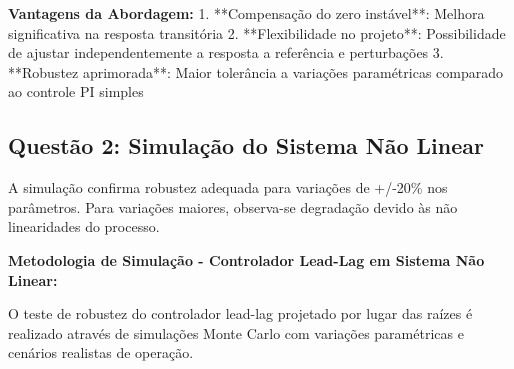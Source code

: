 \documentclass[a4paper,12pt]{article}
\begin{document}
\textbf{Vantagens da Abordagem:}
1. **Compensação do zero instável**: Melhora significativa na resposta transitória
2. **Flexibilidade no projeto**: Possibilidade de ajustar independentemente a resposta a referência e perturbações
3. **Robustez aprimorada**: Maior tolerância a variações paramétricas comparado ao controle PI simples

\subsection{Questão 2: Simulação do Sistema Não Linear}

A simulação confirma robustez adequada para variações de +/-20\% nos parâmetros. Para variações maiores, observa-se degradação devido às não linearidades do processo.

\textbf{Metodologia de Simulação - Controlador Lead-Lag em Sistema Não Linear:}

O teste de robustez do controlador lead-lag projetado por lugar das raízes é realizado através de simulações Monte Carlo com variações paramétricas e cenários realistas de operação.
\end{document}
